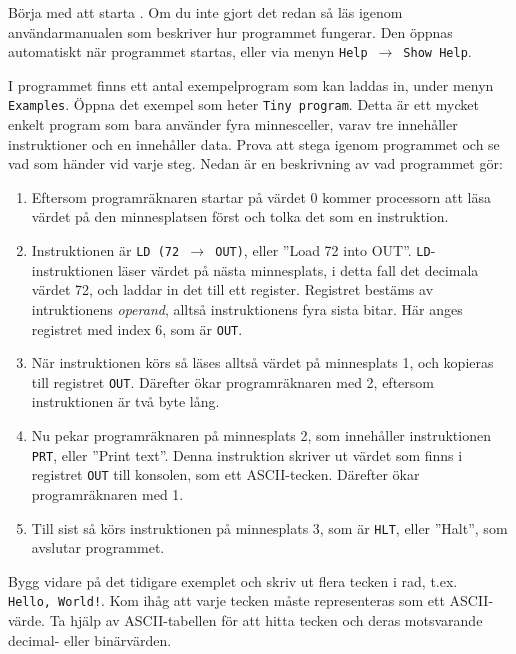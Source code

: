\begin{Datorarbete}
    \item {} Börja med att starta \CPUprogname. Om du inte gjort det redan så läs igenom användarmanualen som beskriver hur programmet fungerar. Den öppnas automatiskt när programmet startas, eller via menyn \texttt{Help}~$\rightarrow$~\texttt{Show Help}.

    \item {} I programmet finns ett antal exempelprogram som kan laddas in, under menyn \texttt{Examples}. Öppna det exempel som heter \texttt{Tiny program}. Detta är ett mycket enkelt program som bara använder fyra minnesceller, varav tre innehåller instruktioner och en innehåller data. Prova att stega igenom programmet och se vad som händer vid varje steg. Nedan är en beskrivning av vad programmet gör:
    \begin{enumerate}
        \item Eftersom programräknaren startar på värdet 0 kommer processorn att läsa värdet på den minnesplatsen först och tolka det som en instruktion.
        \item Instruktionen är \texttt{LD (72 $\rightarrow$ OUT)}, eller ''Load 72 into OUT''. \texttt{LD}-instruktionen läser värdet på nästa minnesplats, i detta fall det decimala värdet 72, och laddar in det till ett register. Registret bestäms av intruktionens \emph{operand}, alltså instruktionens fyra sista bitar. Här anges registret med index 6, som är \texttt{OUT}.
        \item När instruktionen körs så läses alltså värdet på minnesplats 1, och kopieras till registret \texttt{OUT}. Därefter ökar programräknaren med 2, eftersom instruktionen är två byte lång.
        \item Nu pekar programräknaren på minnesplats 2, som innehåller instruktionen \texttt{PRT}, eller ''Print text''. Denna instruktion skriver ut värdet som finns i registret \texttt{OUT} till konsolen, som ett ASCII-tecken. Därefter ökar programräknaren med 1.
        \item Till sist så körs instruktionen på minnesplats 3, som är \texttt{HLT}, eller ''Halt'', som avslutar programmet.
    \end{enumerate}

    \item {} Bygg vidare på det tidigare exemplet och skriv ut flera tecken i rad, t.ex. \texttt{Hello,~World!}. Kom ihåg att varje tecken måste representeras som ett ASCII-värde. Ta hjälp av ASCII-tabellen för att hitta tecken och deras motsvarande decimal- eller binärvärden.


\end{Datorarbete}
